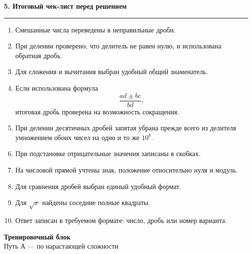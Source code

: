 \documentclass[a4paper,12pt]{article}
\newcommand{\topic}[1]{%
  \vspace{0.3em}
  {\Large\bfseries\textcolor{darkaccent}{#1}}\par
  \vspace{0.3em}
  \noindent\textcolor{accent}{\rule{\linewidth}{0.7pt}}\par
  \vspace{0.5em}
}
\begin{document}
\clearpage


\topic{5. Итоговый чек-лист перед решением}

\begin{enumerate}

  \item
  Смешанные числа переведены в неправильные дроби.

  \item
  При делении проверено, что делитель не равен нулю,
  и использована обратная дробь.

  \item
  Для сложения и вычитания выбран удобный общий знаменатель.

  \item
  Если использована формула
  \[
  \frac{ad\pm bc}{bd},
  \]
  итоговая дробь проверена на возможность сокращения.

  \item
  При делении десятичных дробей запятая убрана
  прежде всего из делителя умножением обоих чисел
  на одно и то же \(10^k\).

  \item
  При подстановке отрицательные значения записаны в скобках.

  \item
  На числовой прямой учтены знак,
  положение относительно нуля и модуль.

  \item
  Для сравнения дробей выбран единый удобный формат.

  \item
  Для \(\sqrt{x}\) найдены соседние полные квадраты.

  \item
  Ответ записан в требуемом формате:
  число, дробь или номер варианта.

\end{enumerate}


\clearpage
\thispagestyle{plain}

\begin{center}
{\LARGE\bfseries
\textcolor{darkaccent}{Тренировочный блок}}
\\[0.25em]
{\large Путь А --- по нарастающей сложности}
\end{center}
\end{document}
